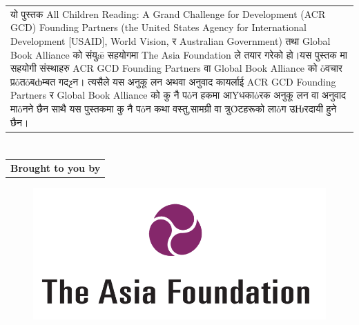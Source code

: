 \documentclass[
  letterpaper,
  DIV=11,
  numbers=noendperiod,
  paper=6in:9in,
  pagesize=pdftex,
  headinclude=on,
  footinclude=on,
  12pt]{scrreprt}
\begin{document}
\begin{longtable}[]{@{}
  >{\raggedright\arraybackslash}p{}@{}}
\toprule\noalign{}
\endhead
\bottomrule\noalign{}
\endlastfoot
यो पुस्तक All Children Reading: A Grand Challenge for Development (ACR
GCD) Founding Partners (the United States Agency for International
Development {[}USAID{]}, World Vision, र Australian Government) तथा
Global Book Alliance को संयुǣ सहयोगमा The Asia Foundation ले तयार गरेको
हो।यस पुस्तक मा सहयोगी संस्थाहरु ACR GCD Founding Partners वा Global Book
Alliance को ȱवचार प्रȱतȱबȸम्बत गदƺन। त्यसैले यस अनुकू लन अथवा अनुवाद कायर्लाई ACR
GCD Founding Partners र Global Book Alliance को कु नै पȱन हकमा आȲधकाȯरक
अनुकू लन वा अनुवाद माȱनने छैन साथै यस पुस्तकमा कु नै पȱन कथा वस्तु,सामग्री वा
त्रुȰटहरूको लाȱग उǶरदायी हुने छैन। \\
\end{longtable}


\hypertarget{section-8}{%
\chapter{}\label{section-8}}

\begin{longtable}[]{@{}c@{}}
\toprule\noalign{}
\endhead
\bottomrule\noalign{}
\endlastfoot
\textbf{Brought to you by} \\
\end{longtable}

\begin{figure}[H]

{\centering \includegraphics{images/aflogo.png}

}

\end{figure}
\end{document}
